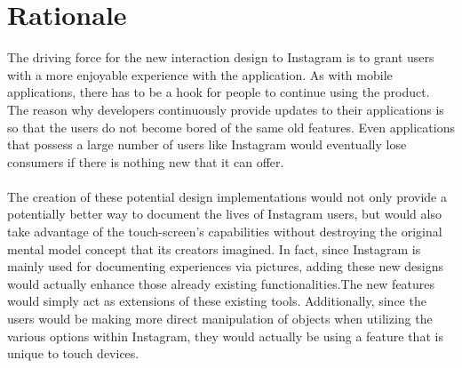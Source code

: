\documentclass[11pt]{article}
\begin{document}
\pagebreak

\section{Rationale}
   \indent
   \indent The driving force for the new interaction design to Instagram is to grant users with a more enjoyable experience with the application. As with mobile applications, there has to be a hook for people to continue using the product. The reason why developers continuously provide updates to their applications is so that the users do not become bored of the same old features. Even applications that possess a large number of users like Instagram would eventually lose consumers if there is nothing new that it can offer. \\ \\
   \indent The creation of these potential design implementations would not only provide a potentially better way to document the lives of Instagram users, but would also take advantage of the touch-screen's capabilities without destroying the original mental model concept that its creators imagined. In fact, since Instagram is mainly used for documenting experiences via pictures, adding these new designs would actually enhance those already existing functionalities.The new features would simply act as extensions of these existing tools.  Additionally, since the users would be making more direct manipulation of objects when utilizing the various options within Instagram, they would actually be using a feature that is unique to touch devices. 
         
\end{document}
